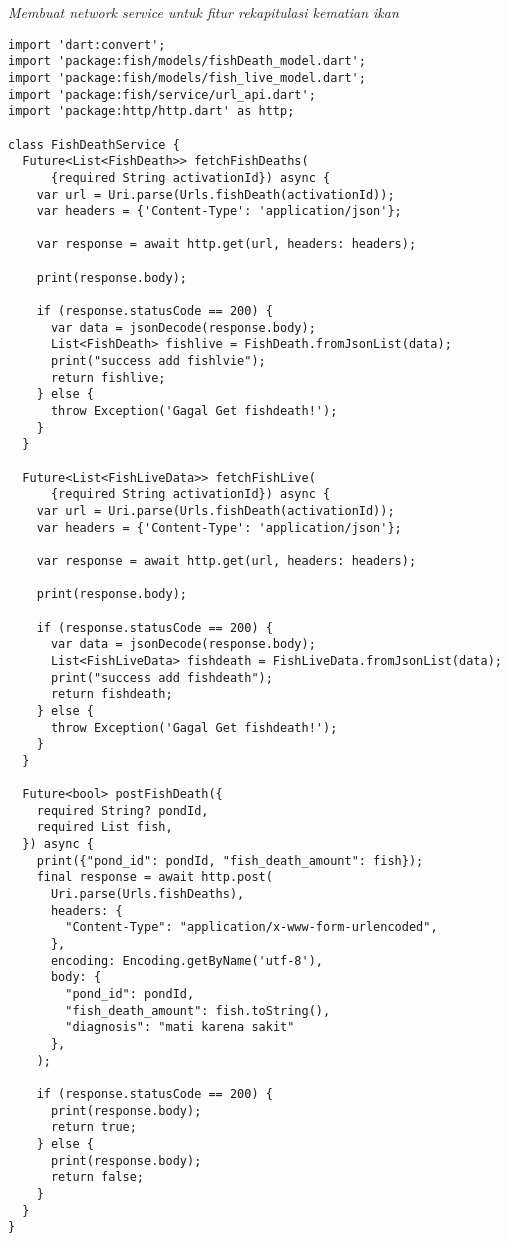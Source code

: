 	\textit{Membuat network service untuk fitur rekapitulasi kematian ikan}
	\begin{lstlisting}
import 'dart:convert';
import 'package:fish/models/fishDeath_model.dart';
import 'package:fish/models/fish_live_model.dart';
import 'package:fish/service/url_api.dart';
import 'package:http/http.dart' as http;

class FishDeathService {
  Future<List<FishDeath>> fetchFishDeaths(
      {required String activationId}) async {
    var url = Uri.parse(Urls.fishDeath(activationId));
    var headers = {'Content-Type': 'application/json'};

    var response = await http.get(url, headers: headers);

    print(response.body);

    if (response.statusCode == 200) {
      var data = jsonDecode(response.body);
      List<FishDeath> fishlive = FishDeath.fromJsonList(data);
      print("success add fishlvie");
      return fishlive;
    } else {
      throw Exception('Gagal Get fishdeath!');
    }
  }

  Future<List<FishLiveData>> fetchFishLive(
      {required String activationId}) async {
    var url = Uri.parse(Urls.fishDeath(activationId));
    var headers = {'Content-Type': 'application/json'};

    var response = await http.get(url, headers: headers);

    print(response.body);

    if (response.statusCode == 200) {
      var data = jsonDecode(response.body);
      List<FishLiveData> fishdeath = FishLiveData.fromJsonList(data);
      print("success add fishdeath");
      return fishdeath;
    } else {
      throw Exception('Gagal Get fishdeath!');
    }
  }

  Future<bool> postFishDeath({
    required String? pondId,
    required List fish,
  }) async {
    print({"pond_id": pondId, "fish_death_amount": fish});
    final response = await http.post(
      Uri.parse(Urls.fishDeaths),
      headers: {
        "Content-Type": "application/x-www-form-urlencoded",
      },
      encoding: Encoding.getByName('utf-8'),
      body: {
        "pond_id": pondId,
        "fish_death_amount": fish.toString(),
        "diagnosis": "mati karena sakit"
      },
    );

    if (response.statusCode == 200) {
      print(response.body);
      return true;
    } else {
      print(response.body);
      return false;
    }
  }
}
	\end{lstlisting}

